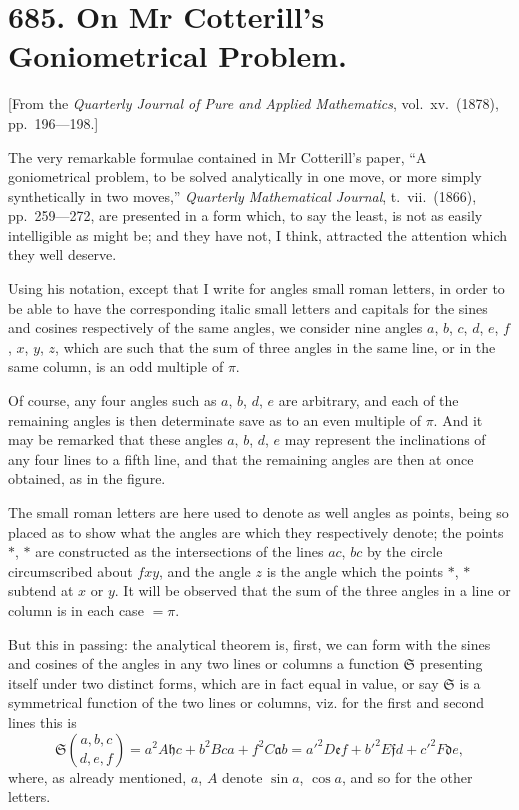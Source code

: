 \documentclass[12pt,a4paper]{article}
\theoremstyle{cayley}
\theoremstyle{definition}
\numberwithin{equation}{section}
\begin{document}
\newpage

\section*{685. On Mr Cotterill's Goniometrical Problem.}

[From the \textit{Quarterly Journal of Pure and Applied Mathematics}, vol.\ xv.\ (1878), pp.\ 196---198.]

The very remarkable formulae contained in Mr Cotterill's paper, ``A goniometrical problem, to be solved analytically in one move, or more simply synthetically in two moves,'' \textit{Quarterly Mathematical Journal}, t.\ vii.\ (1866), pp.\ 259---272, are presented in a form which, to say the least, is not as easily intelligible as might be; and they have not, I think, attracted the attention which they well deserve.

Using his notation, except that I write for angles small roman letters, in order to be able to have the corresponding italic small letters and capitals for the sines and cosines respectively of the same angles, we consider nine angles $a$, $b$, $c$, $d$, $e$, $f$, $x$, $y$, $z$, which are such that the sum of three angles in the same line, or in the same column, is an odd multiple of $\pi$.

Of course, any four angles such as $a$, $b$, $d$, $e$ are arbitrary, and each of the remaining angles is then determinate save as to an even multiple of $\pi$. And it may be remarked that these angles $a$, $b$, $d$, $e$ may represent the inclinations of any four lines to a fifth line, and that the remaining angles are then at once obtained, as in the figure.

The small roman letters are here used to denote as well angles as points, being so placed as to show what the angles are which they respectively denote; the points $*$, $*$ are constructed as the intersections of the lines $ac$, $bc$ by the circle circumscribed about $fxy$, and the angle $z$ is the angle which the points $*$, $*$ subtend at $x$ or $y$. It will be observed that the sum of the three angles in a line or column is in each case $= \pi$.

But this in passing: the analytical theorem is, first, we can form with the sines and cosines of the angles in any two lines or columns a function $\mathfrak{S}$ presenting itself under two distinct forms, which are in fact equal in value, or say $\mathfrak{S}$ is a symmetrical function of the two lines or columns, viz. for the first and second lines this is
\[
\mathfrak{S}\binom{a,b,c}{d,e,f} = a^2 A\mathfrak{h}c + b^2 Bca + f^2 C\mathfrak{a}b = a'^2 D\mathfrak{e}f + b'^2 E\mathfrak{f}d + c'^2 F\mathfrak{d}e,
\]
where, as already mentioned, $a$, $A$ denote $\sin a$, $\cos a$, and so for the other letters.
\end{document}
